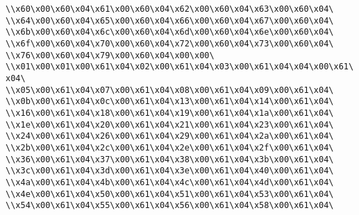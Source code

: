 \verb|\\x60\x00\x60\x04\x61\x00\x60\x04\x62\x00\x60\x04\x63\x00\x60\x04\|\newline
\verb|\\x64\x00\x60\x04\x65\x00\x60\x04\x66\x00\x60\x04\x67\x00\x60\x04\|\newline
\verb|\\x6b\x00\x60\x04\x6c\x00\x60\x04\x6d\x00\x60\x04\x6e\x00\x60\x04\|\newline
\verb|\\x6f\x00\x60\x04\x70\x00\x60\x04\x72\x00\x60\x04\x73\x00\x60\x04\|\newline
\verb|\\x76\x00\x60\x04\x79\x00\x60\x04\x00\x00\|\newline
\verb|\\x01\x00\x01\x00\x61\x04\x02\x00\x61\x04\x03\x00\x61\x04\x04\x00\x61\x04\|\newline
\verb|\\x05\x00\x61\x04\x07\x00\x61\x04\x08\x00\x61\x04\x09\x00\x61\x04\|\newline
\verb|\\x0b\x00\x61\x04\x0c\x00\x61\x04\x13\x00\x61\x04\x14\x00\x61\x04\|\newline
\verb|\\x16\x00\x61\x04\x18\x00\x61\x04\x19\x00\x61\x04\x1a\x00\x61\x04\|\newline
\verb|\\x1e\x00\x61\x04\x20\x00\x61\x04\x21\x00\x61\x04\x23\x00\x61\x04\|\newline
\verb|\\x24\x00\x61\x04\x26\x00\x61\x04\x29\x00\x61\x04\x2a\x00\x61\x04\|\newline
\verb|\\x2b\x00\x61\x04\x2c\x00\x61\x04\x2e\x00\x61\x04\x2f\x00\x61\x04\|\newline
\verb|\\x36\x00\x61\x04\x37\x00\x61\x04\x38\x00\x61\x04\x3b\x00\x61\x04\|\newline
\verb|\\x3c\x00\x61\x04\x3d\x00\x61\x04\x3e\x00\x61\x04\x40\x00\x61\x04\|\newline
\verb|\\x4a\x00\x61\x04\x4b\x00\x61\x04\x4c\x00\x61\x04\x4d\x00\x61\x04\|\newline
\verb|\\x4e\x00\x61\x04\x50\x00\x61\x04\x51\x00\x61\x04\x53\x00\x61\x04\|\newline
\verb|\\x54\x00\x61\x04\x55\x00\x61\x04\x56\x00\x61\x04\x58\x00\x61\x04\|\newline
